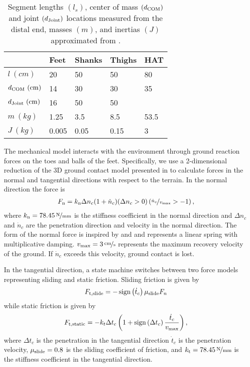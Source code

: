 \begin{table}[b]
  \centering
      \begin{tabular}{lllll}
        \toprule
        & Feet & Shanks & Thighs & HAT \\
        \midrule
        $l         \ (\unit{cm})$ & 20    & 50   & 50   & 80   \\
        $d_\tn{COM}   \ (\unit{cm})$ & 14    & 30   & 30   & 35   \\
        $d_\tn{Joint} \ (\unit{cm})$ & 16    & 50   & 50   &      \\
        $m         \ (\unit{kg})$ & 1.25  & 3.5  & 8.5  & 53.5 \\
        $J         \ (\unit{kg})$ & 0.005 & 0.05 & 0.15 & 3    \\
        \bottomrule
      \end{tabular}
  \caption{Segment lengths $(l_s)$, center of mass $(d_{\textnormal{COM}})$ and joint
  $(d_{\textnormal{Joint}})$ locations measured from the distal end, masses $(m)$, and
  inertias $(J)$ approximated from
  \citet{gunther2003synthesis}.}\label{tab:model_mech_params}
\end{table}

The mechanical model interacts with the environment through ground reaction
forces on the toes and balls of the feet. Specifically, we use a 2-dimensional
reduction of the 3D ground contact model presented in
\citet{song2013generalization} to calculate forces in the normal and
tangential directions with respect to the terrain. In the normal direction the
force is
\begin{align}
    F_{\textnormal{n}} = k_{\textnormal{n}} \Delta n_c (1 + \dot n_c) (\Delta n_c > 0)
    \left(\nicefrac{\dot n_c}{v_{\textnormal{max}}} > -1 \right),
    \label{eq:grf_n}
\end{align}
where $k_\tn{n} = \unitfrac[78.45]{N}{mm}$ is the stiffness coefficient in the
normal direction and $\Delta n_c$ and $\dot n_c$ are the penetration direction
and velocity in the normal direction. The form of the normal force is inspired
by \citet{gunther2003synthesis} and \citet{scott1993biomechanical} and
represents a linear spring with multiplicative damping.  $v_\tn{max} =
\unitfrac[3]{cm}{s}$ represents the maximum recovery velocity of the ground. If
$\dot n_c$ exceeds this velocity, ground contact is lost.

In the tangential direction, a state machine switches between two force models
representing sliding and static friction. Sliding friction is given by
\begin{align}
    F_{\tn{t,slide}} = -\func{sign}{\dot t_c} \mu_\tn{slide} F_n
\end{align}
while static friction is given by
\begin{align}
    F_{\tn{t,static}} = -k_t \Delta t_c \left(1 + \func{sign}{\Delta t_c}
    \frac{\dot t_c}{v_\tn{max}} \right),
\end{align}
where $\Delta t_c$ is the penetration in the tangential direction $\dot t_c$ is
the penetration velocity, $\mu_{\textnormal{slide}} = 0.8$ is the sliding coefficient of
friction, and $k_\tn{t} =\unitfrac[78.45]{N}{mm}$ is the stiffness coefficient
in the tangential direction.

